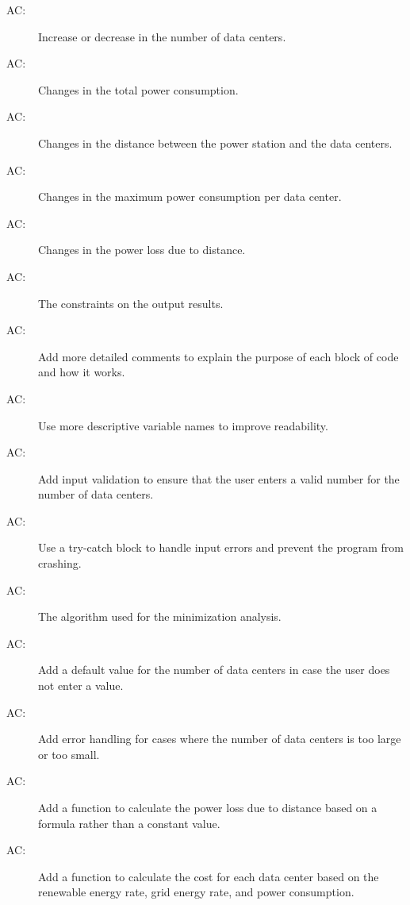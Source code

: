 \documentclass[12pt]{article}
\newcounter{acnum}
\newcommand{\actheacnum}{AC\theacnum}
\begin{document}
\begin{description}
\item[ \actheacnum \label{acHardware}:] Increase or decrease in the number of data centers.
\item[ \actheacnum \label{acInput}:] Changes in the total power consumption.
\item[ \actheacnum \label{acParams}:] Changes in the distance between the power station and the data centers.
\item[ \actheacnum \label{acVerify}:] Changes in the maximum power consumption per data center.
\item[ \actheacnum \label{acOutput}:] Changes in the power loss due to distance.
\item[ \actheacnum \label{acVerifyOut}:] The constraints on the output results.
\item[ \actheacnum \label{acODEs}:] Add more detailed comments to explain the purpose of each block of code and how it works.
\item[ \actheacnum \label{acEnergy}:] Use more descriptive variable names to improve readability.
\item[ \actheacnum \label{acControl}:] Add input validation to ensure that the user enters a valid number for the number of data centers.
\item[ \actheacnum \label{acSeqDS}:]Use a try-catch block to handle input errors and prevent the program from crashing.
\item[ \actheacnum \label{acSolver}:] The algorithm used
  for the minimization analysis.
\item[ \actheacnum \label{acPlot}:] Add a default value for the number of data centers in case the user does not enter a value.
\item[ \actheacnum \label{ac2}:] Add error handling for cases where the number of data centers is too large or too small.
\item[ \actheacnum \label{ac3}:] Add a function to calculate the power loss due to distance based on a formula rather than a constant value.
\item[ \actheacnum \label{ac4}:] Add a function to calculate the cost for each data center based on the renewable energy rate, grid energy rate, and power consumption.

\end{description}
\end{document}

